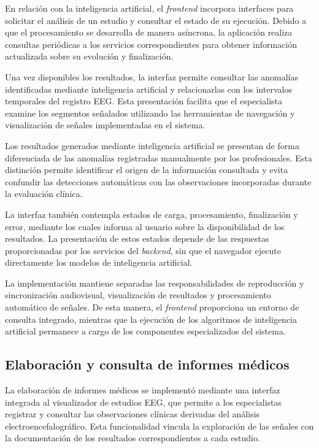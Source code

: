 En relación con la inteligencia
artificial, el \textit{frontend} incorpora
interfaces para solicitar el análisis
de un estudio y consultar el estado
de su ejecución. Debido a que el
procesamiento se desarrolla de manera
asíncrona, la aplicación realiza
consultas periódicas a los servicios
correspondientes para obtener
información actualizada sobre
su evolución y finalización.

Una vez disponibles los resultados,
la interfaz permite consultar las
anomalías identificadas mediante
inteligencia artificial y relacionarlas
con los intervalos temporales del
registro EEG. Esta presentación
facilita que el especialista examine
los segmentos señalados utilizando
las herramientas de navegación
y visualización de señales
implementadas en el sistema.

Los resultados generados mediante
inteligencia artificial se presentan
de forma diferenciada de las
anomalías registradas manualmente
por los profesionales. Esta
distinción permite identificar
el origen de la información
consultada y evita confundir
las detecciones automáticas
con las observaciones incorporadas
durante la evaluación clínica.

La interfaz también contempla
estados de carga, procesamiento,
finalización y error, mediante
los cuales informa al usuario
sobre la disponibilidad de los
resultados. La presentación
de estos estados depende de
las respuestas proporcionadas
por los servicios del \textit{backend},
sin que el navegador ejecute
directamente los modelos
de inteligencia artificial.

La implementación mantiene
separadas las responsabilidades
de reproducción y sincronización
audiovisual, visualización de
resultados y procesamiento
automático de señales. De esta
manera, el \textit{frontend} proporciona
un entorno de consulta integrado,
mientras que la ejecución de
los algoritmos de inteligencia
artificial permanece a cargo
de los componentes especializados
del sistema.


\subsection{Elaboración y consulta de informes médicos}

La elaboración de informes médicos se implementó
mediante una interfaz integrada al visualizador
de estudios EEG, que permite a los especialistas
registrar y consultar las observaciones clínicas
derivadas del análisis electroencefalográfico.
Esta funcionalidad vincula la exploración de las
señales con la documentación de los resultados
correspondientes a cada estudio.

